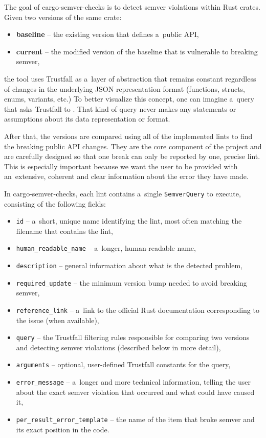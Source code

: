 \documentclass[licencjacka,en]{pracamgr}
\begin{document}
The goal of cargo-semver-checks is to detect semver violations within Rust crates. Given two
versions of the same crate:
\begin{itemize}
	\item \textbf{baseline} -- the existing version that defines a~public API,
	\item \textbf{current} -- the modified version of the baseline that is vulnerable to
		breaking semver,
\end{itemize}
the tool uses Trustfall as a~layer of abstraction that remains constant regardless of changes in
the underlying JSON representation format (functions, structs, enums, variants, etc.) To better
visualize this concept, one can imagine a~query that asks Trustfall to . That kind
of query never makes any statements or assumptions about its data representation or format.

After that, the versions are compared using all of the implemented lints to find the breaking
public API changes. They are the core component of the project and are carefully designed so that
one break can only be reported by one, precise lint. This is especially important because we want
the user to be provided with an~extensive, coherent and clear information about the error they
have made.

In cargo-semver-checks, each lint contains a~single \texttt{SemverQuery} to execute, consisting of
the following fields:

\begin{itemize}
	\item \texttt{id} -- a~short, unique name identifying the lint, most often matching the
		filename that contains the lint,
	\item \texttt{human\_readable\_name} -- a~longer, human-readable name,
	\item \texttt{description} -- general information about what is the detected problem,
	\item \texttt{required\_update} -- the minimum version bump needed to avoid breaking semver,
	\item \texttt{reference\_link} -- a~link to the official Rust documentation corresponding to
		the issue (when available),
	\item \texttt{query} -- the Trustfall filtering rules responsible for comparing two versions
		and detecting semver violations (described below in more detail),
	\item \texttt{arguments} -- optional, user-defined Trustfall constants for the query,
	\item \texttt{error\_message} -- a~longer and more technical information, telling the user
	    about the exact semver violation that occurred and what could have caused it,
	\item \texttt{per\_result\_error\_template} -- the name of the item that broke semver and
	    its exact position in the code.
\end{itemize}
\end{document}
